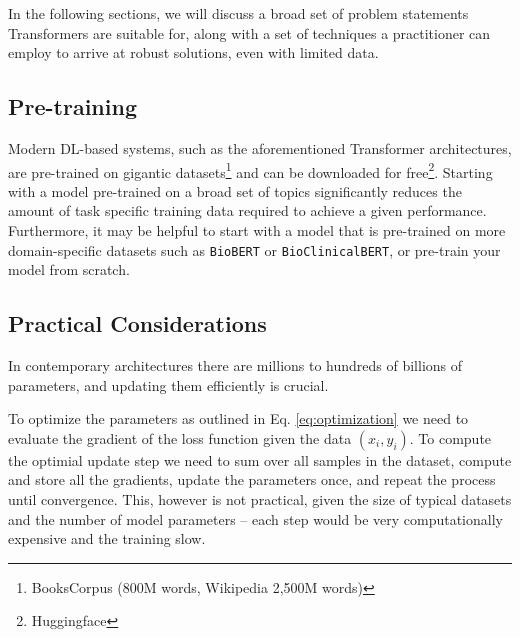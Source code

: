 In the following sections, we will discuss a broad set of problem statements Transformers are suitable for, along with a set of techniques a practitioner can employ to arrive at robust solutions, even with limited data.

\subsection{Pre-training}
Modern DL-based systems, such as the aforementioned Transformer architectures, are pre-trained on gigantic datasets\footnote{BooksCorpus (800M words, Wikipedia 2,500M words)}\cite{bertpaper} and can be downloaded for free\footnote{Huggingface}.
Starting with a model pre-trained on a broad set of topics significantly reduces the amount of task specific training data required to achieve a given performance.
Furthermore, it may be helpful to start with a model that is pre-trained on more domain-specific datasets such as \texttt{BioBERT\cite{DBLP:journals/corr/abs-1901-08746}} or \texttt{Bio\textunderscore ClinicalBERT\cite{clinicalbert}}, or pre-train your model from scratch.

\subsection{Practical Considerations}
In contemporary architectures there are millions to hundreds of billions of parameters, and updating them efficiently is crucial.

To optimize the parameters as outlined in Eq. \ref{eq:optimization} we need to evaluate the gradient of the loss function given the data $(x_i, y_i)$.
To compute the optimial update step we need to sum over all samples in the dataset, compute and store all the gradients, update the parameters once, and repeat the process until convergence.
This, however is not practical, given the size of typical datasets and the number of model parameters -- each step would be very computationally expensive and the training slow.

